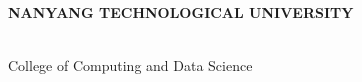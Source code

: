 \makeatletter
\begin{titlepage}
\begin{center}

\uppercase{\textbf{\large{Nanyang Technological University}}}
\\[7cm]

\uppercase{\textbf{\large{\@title}}}

\vfill
\@author
\\[3cm]

College of Computing and Data Science

\@date

\end{center}
\end{titlepage}
\makeatother
